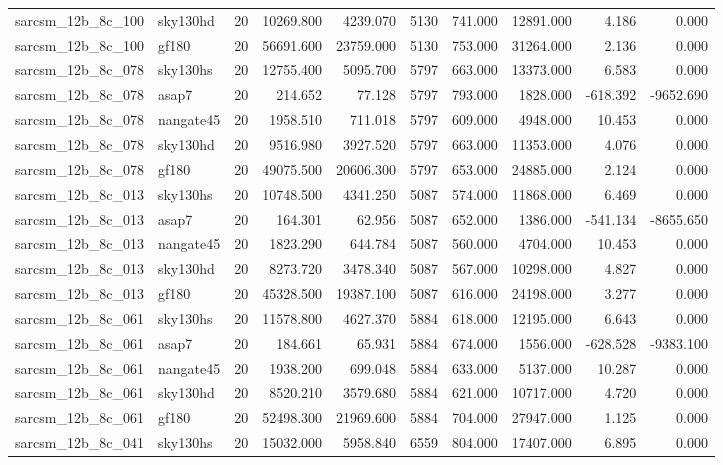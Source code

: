\begin{tabular}{llrrrrrrrr}
sarcsm\_12b\_8c\_100 & sky130hd & 20 & 10269.800 & 4239.070 & 5130 & 741.000 & 12891.000 & 4.186 & 0.000 \\
sarcsm\_12b\_8c\_100 & gf180 & 20 & 56691.600 & 23759.000 & 5130 & 753.000 & 31264.000 & 2.136 & 0.000 \\
sarcsm\_12b\_8c\_078 & sky130hs & 20 & 12755.400 & 5095.700 & 5797 & 663.000 & 13373.000 & 6.583 & 0.000 \\
sarcsm\_12b\_8c\_078 & asap7 & 20 & 214.652 & 77.128 & 5797 & 793.000 & 1828.000 & -618.392 & -9652.690 \\
sarcsm\_12b\_8c\_078 & nangate45 & 20 & 1958.510 & 711.018 & 5797 & 609.000 & 4948.000 & 10.453 & 0.000 \\
sarcsm\_12b\_8c\_078 & sky130hd & 20 & 9516.980 & 3927.520 & 5797 & 663.000 & 11353.000 & 4.076 & 0.000 \\
sarcsm\_12b\_8c\_078 & gf180 & 20 & 49075.500 & 20606.300 & 5797 & 653.000 & 24885.000 & 2.124 & 0.000 \\
sarcsm\_12b\_8c\_013 & sky130hs & 20 & 10748.500 & 4341.250 & 5087 & 574.000 & 11868.000 & 6.469 & 0.000 \\
sarcsm\_12b\_8c\_013 & asap7 & 20 & 164.301 & 62.956 & 5087 & 652.000 & 1386.000 & -541.134 & -8655.650 \\
sarcsm\_12b\_8c\_013 & nangate45 & 20 & 1823.290 & 644.784 & 5087 & 560.000 & 4704.000 & 10.453 & 0.000 \\
sarcsm\_12b\_8c\_013 & sky130hd & 20 & 8273.720 & 3478.340 & 5087 & 567.000 & 10298.000 & 4.827 & 0.000 \\
sarcsm\_12b\_8c\_013 & gf180 & 20 & 45328.500 & 19387.100 & 5087 & 616.000 & 24198.000 & 3.277 & 0.000 \\
sarcsm\_12b\_8c\_061 & sky130hs & 20 & 11578.800 & 4627.370 & 5884 & 618.000 & 12195.000 & 6.643 & 0.000 \\
sarcsm\_12b\_8c\_061 & asap7 & 20 & 184.661 & 65.931 & 5884 & 674.000 & 1556.000 & -628.528 & -9383.100 \\
sarcsm\_12b\_8c\_061 & nangate45 & 20 & 1938.200 & 699.048 & 5884 & 633.000 & 5137.000 & 10.287 & 0.000 \\
sarcsm\_12b\_8c\_061 & sky130hd & 20 & 8520.210 & 3579.680 & 5884 & 621.000 & 10717.000 & 4.720 & 0.000 \\
sarcsm\_12b\_8c\_061 & gf180 & 20 & 52498.300 & 21969.600 & 5884 & 704.000 & 27947.000 & 1.125 & 0.000 \\
sarcsm\_12b\_8c\_041 & sky130hs & 20 & 15032.000 & 5958.840 & 6559 & 804.000 & 17407.000 & 6.895 & 0.000 \\

\end{tabular}
